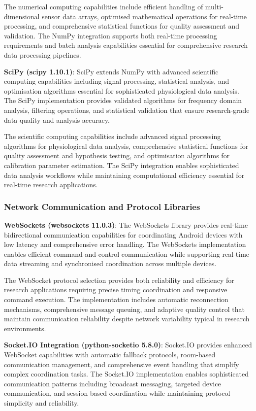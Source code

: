 \documentclass[11pt,a4paper]{report}
\begin{document}
The numerical computing capabilities include efficient handling of multi-dimensional sensor data arrays, optimised mathematical operations for real-time processing, and comprehensive statistical functions for quality assessment and validation. The NumPy integration supports both real-time processing requirements and batch analysis capabilities essential for comprehensive research data processing pipelines.

\noindent \textbf{SciPy (scipy 1.10.1)}: SciPy extends NumPy with advanced scientific computing capabilities including signal processing, statistical analysis, and optimisation algorithms essential for sophisticated physiological data analysis. The SciPy implementation provides validated algorithms for frequency domain analysis, filtering operations, and statistical validation that ensure research-grade data quality and analysis accuracy.

The scientific computing capabilities include advanced signal processing algorithms for physiological data analysis, comprehensive statistical functions for quality assessment and hypothesis testing, and optimisation algorithms for calibration parameter estimation. The SciPy integration enables sophisticated data analysis workflows while maintaining computational efficiency essential for real-time research applications.

\subsubsection{Network Communication and Protocol Libraries}

\noindent \textbf{WebSockets (websockets 11.0.3)}: The WebSockets library provides real-time bidirectional communication capabilities for coordinating Android devices with low latency and comprehensive error handling. The WebSockets implementation enables efficient command-and-control communication while supporting real-time data streaming and synchronised coordination across multiple devices.

The WebSocket protocol selection provides both reliability and efficiency for research applications requiring precise timing coordination and responsive command execution. The implementation includes automatic reconnection mechanisms, comprehensive message queuing, and adaptive quality control that maintain communication reliability despite network variability typical in research environments.

\noindent \textbf{Socket.IO Integration (python-socketio 5.8.0)}: Socket.IO provides enhanced WebSocket capabilities with automatic fallback protocols, room-based communication management, and comprehensive event handling that simplify complex coordination tasks. The Socket.IO implementation enables sophisticated communication patterns including broadcast messaging, targeted device communication, and session-based coordination while maintaining protocol simplicity and reliability.
\end{document}

